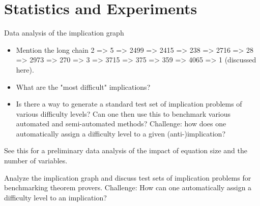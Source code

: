 \section{Statistics and Experiments}


Data analysis of the implication graph

\begin{itemize}
    \item Mention the long chain 2 => 5 => 2499 => 2415 => 238 => 2716 => 28 => 2973 => 270 => 3 => 3715 => 375 => 359 => 4065 => 1 (discussed here).
\item What are the "most difficult" implications?
\item Is there a way to generate a standard test set of implication problems of various difficulty levels? Can one then use this to benchmark various automated and semi-automated methods? Challenge: how does one automatically assign a difficulty level to a given (anti-)implication?
\end{itemize}

See this for a preliminary data analysis of the impact of equation size and the number of variables.

Analyze the implication graph and discuss test sets of implication problems for benchmarking theorem provers. Challenge: How can one automatically assign a difficulty level to an implication?
